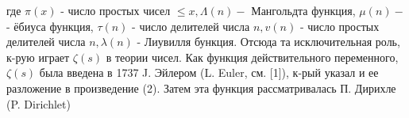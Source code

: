 \documentclass[10pt]{article}
\begin{document}
где $\pi(x)$ - число простых чисел $\leqslant x, \Lambda(n)-$ Мангольдта функция, $\mu(n)-$ - ёбиуса функция, $\tau(n)$ - число делителей числа $n, v(n)$ - число простых делителей числа $n, \lambda(n)$ - Лиувилля бункция. Отсюда та исключительная роль, к-рую играет $\zeta(s)$ в теории чисел. Как функция действительного переменного, $\zeta(s)$ была введена в 1737 J. Эйлером (L. Euler, см. [1]), к-рый указал и ее разложение в произведение (2). Затем эта функция рассматривалась П. Дирихле (P. Dirichlet)
\end{document}
